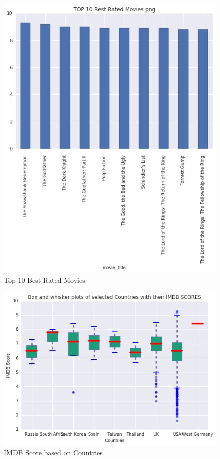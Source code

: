 \documentclass{article}%
\begin{document}
\begin{figure}
\centering
\includegraphics[width=1.0\columnwidth]{Fig/TOP10BestRatedMovies.png}
\caption{Top 10 Best Rated Movies}
\label{fig:TOP 10 Best Rated Movies}
\end{figure}

\begin{figure}
\centering
\includegraphics[width=1.0\columnwidth]{Fig/Boxandwhiskerplotofcountriesbasedonimdbscore.png}
\caption{IMDB Score based on Countries}
\label{fig:Box and whisker plotofcountriesbasedonimdbscore}
\end{figure}
\end{document}
